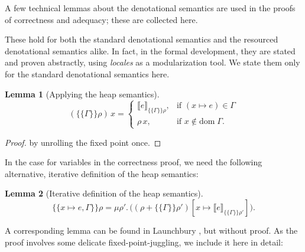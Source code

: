 \documentclass{jfp1}
\newtheorem{lemma}{Lemma}
\theoremstyle{nonumberbreak}
\newtheorem{proof}{Proof}
\newcommand{\dom}[1]{\text{dom}\;#1}
\newcommand{\dsem}[2]{\llbracket #1 \rrbracket_{#2}}
\newcommand{\esem}[1]{\{\!\!\!\{#1\}\!\!\!\}}
\newcommand{\upd}[1]{\mathop{++_{#1}}}
\begin{document}
A few technical lemmas about the denotational semantics are used in the proofs of correctness and adequacy; these are collected here.

These hold for both the standard denotational semantics and the resourced denotational semantics alike. In fact, in the formal development, they are stated and proven abstractly, using \emph{locales} \cite{locales} as a modularization tool. We state them only for the standard denotational semantics here.


\begin{lemma}[Applying the heap semantics]
\[
\label{lem_esem_this}
\label{lem_esem_other}
(\esem{\Gamma}\rho)\,x =
\begin{cases}
\dsem{e}{\esem{\Gamma}\rho}, & \text{if } (x\mapsto e)\in \Gamma \\
\rho\, x, & \text{if } x \notin \dom\Gamma.
\end{cases}
\]
\end{lemma}

\begin{proof}
by unrolling the fixed point once.
\end{proof}

In the case for variables in the correctness proof, we need the following alternative, iterative definition of the heap semantics:

\begin{lemma}[Iterative definition of the heap semantics]
\[
\esem{x \mapsto e, \Gamma}\rho =
\mu \rho'.\,  \big((\rho \upd{\dom\Gamma} {\esem{\Gamma}{\rho'}})[x \mapsto \dsem{e}{\esem{\Gamma}\rho'}]\big).
\label{lem_iter}
\]
\end{lemma}

A corresponding lemma can be found in Launchbury , but without proof. As the proof involves some delicate fixed-point-juggling, we include it here in detail:
\end{document}
